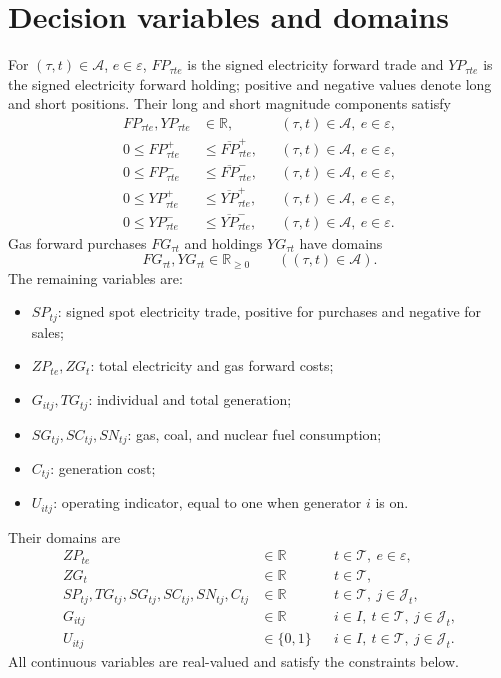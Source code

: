 \documentclass[11pt,a4paper]{article}
\begin{document}
\section*{Decision variables and domains}
For $(\tau,t)\in\mathcal A$, $e\in\varepsilon$, $FP_{\tau te}$ is the signed electricity forward trade and $YP_{\tau te}$ is the signed electricity forward holding; positive and negative values denote long and short positions. Their long and short magnitude components satisfy
\begin{align*}
FP_{\tau te},YP_{\tau te}&\in\mathbb R,
&& (\tau,t)\in\mathcal A,\ e\in\varepsilon,\\
0\le FP_{\tau te}^{+}&\le\overline{FP}_{\tau te}^{+},
&& (\tau,t)\in\mathcal A,\ e\in\varepsilon,\\
0\le FP_{\tau te}^{-}&\le\overline{FP}_{\tau te}^{-},
&& (\tau,t)\in\mathcal A,\ e\in\varepsilon,\\
0\le YP_{\tau te}^{+}&\le\overline{YP}_{\tau te}^{+},
&& (\tau,t)\in\mathcal A,\ e\in\varepsilon,\\
0\le YP_{\tau te}^{-}&\le\overline{YP}_{\tau te}^{-},
&& (\tau,t)\in\mathcal A,\ e\in\varepsilon.
\end{align*}
Gas forward purchases $FG_{\tau t}$ and holdings $YG_{\tau t}$ have domains
\[
FG_{\tau t},YG_{\tau t}\in\mathbb R_{\ge0}
\qquad ((\tau,t)\in\mathcal A).
\]
The remaining variables are:
\begin{itemize}
\item $SP_{tj}$: signed spot electricity trade, positive for purchases and negative for sales;
\item $ZP_{te},ZG_t$: total electricity and gas forward costs;
\item $G_{itj},TG_{tj}$: individual and total generation;
\item $SG_{tj},SC_{tj},SN_{tj}$: gas, coal, and nuclear fuel consumption;
\item $C_{tj}$: generation cost;
\item $U_{itj}$: operating indicator, equal to one when generator $i$ is on.
\end{itemize}
Their domains are
\begin{align*}
ZP_{te}&\in\mathbb R
&&t\in\mathcal T,\ e\in\varepsilon,\\
ZG_t&\in\mathbb R
&&t\in\mathcal T,\\
SP_{tj},TG_{tj},SG_{tj},SC_{tj},SN_{tj},C_{tj}&\in\mathbb R
&&t\in\mathcal T,\ j\in\mathcal J_t,\\
G_{itj}&\in\mathbb R
&&i\in I,\ t\in\mathcal T,\ j\in\mathcal J_t,\\
U_{itj}&\in\{0,1\}
&&i\in I,\ t\in\mathcal T,\ j\in\mathcal J_t.
\end{align*}
All continuous variables are real-valued and satisfy the constraints below.
\end{document}
